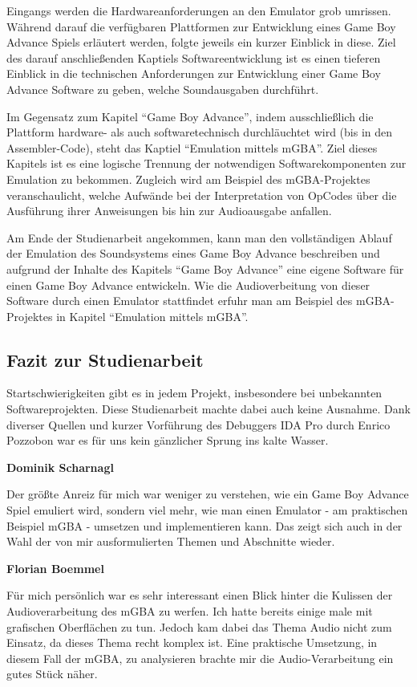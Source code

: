 \documentclass[11pt,a4paper]{scrartcl}
\newcommand{\paratitle}[1] {
    \vspace{5mm}
    \large \textbf{#1} \normalsize
    \vspace{2mm}\newline
}
\begin{document}
Eingangs werden die Hardwareanforderungen an den Emulator grob umrissen. W\"ahrend darauf die verf\"ugbaren Plattformen zur Entwicklung eines Game Boy Advance Spiels erl\"autert werden,  folgte jeweils ein kurzer Einblick in diese. Ziel des darauf anschlie{\ss}enden Kaptiels Softwareentwicklung ist es einen tieferen Einblick in die technischen Anforderungen zur Entwicklung einer Game Boy Advance Software zu geben, welche Soundausgaben durchf\"uhrt.

Im Gegensatz zum Kapitel \enquote{Game Boy Advance}, indem ausschlie{\ss}lich die Plattform hardware- als auch softwaretechnisch durchl\"auchtet wird (bis in den Assembler-Code), steht das Kaptiel \enquote{Emulation mittels mGBA}. Ziel dieses Kapitels ist es eine logische Trennung der notwendigen Softwarekomponenten zur Emulation zu bekommen. Zugleich wird am Beispiel des mGBA-Projektes veranschaulicht, welche Aufw\"ande bei der Interpretation von OpCodes \"uber die Ausf\"uhrung ihrer Anweisungen bis hin zur Audioausgabe anfallen.

Am Ende der Studienarbeit angekommen, kann man den vollst\"andigen Ablauf der Emulation des Soundsystems eines Game Boy Advance beschreiben und aufgrund der Inhalte des Kapitels \enquote{Game Boy Advance} eine eigene Software f\"ur einen Game Boy Advance entwickeln. Wie die Audioverbeitung von dieser Software durch einen Emulator stattfindet erfuhr man am Beispiel des mGBA-Projektes in Kapitel \enquote{Emulation mittels mGBA}.



\subsection{Fazit zur Studienarbeit}
Startschwierigkeiten gibt es in jedem Projekt, insbesondere bei unbekannten Softwareprojekten. Diese Studienarbeit machte dabei auch keine Ausnahme. Dank diverser Quellen und kurzer Vorf\"uhrung des Debuggers IDA Pro durch Enrico Pozzobon war es f\"ur uns kein g\"anzlicher Sprung ins kalte Wasser.

\vspace{-2mm}
\paratitle{Dominik Scharnagl}
Der gr\"o{\ss}te Anreiz f\"ur mich war weniger zu verstehen, wie ein Game Boy Advance Spiel emuliert wird, sondern viel mehr, wie man einen Emulator - am praktischen Beispiel mGBA - umsetzen und implementieren kann. Das zeigt sich auch in der Wahl der von mir ausformulierten Themen und Abschnitte wieder.

\vspace{-2mm}
\paratitle{Florian Boemmel}
F\"ur mich pers\"onlich war es sehr interessant einen Blick hinter die Kulissen der Audioverarbeitung des mGBA zu werfen. Ich hatte bereits einige male mit grafischen Oberfl\"achen zu tun. Jedoch kam dabei das Thema Audio nicht zum Einsatz, da dieses Thema recht komplex ist. Eine praktische Umsetzung, in diesem Fall der mGBA, zu analysieren brachte mir die Audio-Verarbeitung ein gutes St\"uck n\"aher. 
\end{document}
